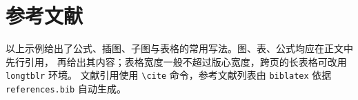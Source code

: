 \section{参考文献}

以上示例给出了公式、插图、子图与表格的常用写法。图、表、公式均应在正文中先行引用，
再给出其内容；表格宽度一般不超过版心宽度，跨页的长表格可改用 \texttt{longtblr} 环境。
文献引用使用 \verb|\cite| 命令，参考文献列表由 \texttt{biblatex} 依据
\texttt{references.bib} 自动生成。
